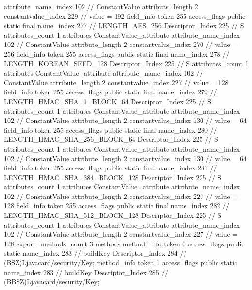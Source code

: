 {{{{{{{					attribute_name_index	102		// ConstantValue
					attribute_length	2
					constantvalue_index	229		// value = 192
				}
				}
			}
			field_info {
				token	255
				access_flags	public static final
				name_index	277		// LENGTH_AES_256
				Descriptor_Index	225		// S
				attributes_count	1
				attributes {
				ConstantValue_attribute {
					attribute_name_index	102		// ConstantValue
					attribute_length	2
					constantvalue_index	270		// value = 256
				}
				}
			}
			field_info {
				token	255
				access_flags	public static final
				name_index	278		// LENGTH_KOREAN_SEED_128
				Descriptor_Index	225		// S
				attributes_count	1
				attributes {
				ConstantValue_attribute {
					attribute_name_index	102		// ConstantValue
					attribute_length	2
					constantvalue_index	227		// value = 128
				}
				}
			}
			field_info {
				token	255
				access_flags	public static final
				name_index	279		// LENGTH_HMAC_SHA_1_BLOCK_64
				Descriptor_Index	225		// S
				attributes_count	1
				attributes {
				ConstantValue_attribute {
					attribute_name_index	102		// ConstantValue
					attribute_length	2
					constantvalue_index	130		// value = 64
				}
				}
			}
			field_info {
				token	255
				access_flags	public static final
				name_index	280		// LENGTH_HMAC_SHA_256_BLOCK_64
				Descriptor_Index	225		// S
				attributes_count	1
				attributes {
				ConstantValue_attribute {
					attribute_name_index	102		// ConstantValue
					attribute_length	2
					constantvalue_index	130		// value = 64
				}
				}
			}
			field_info {
				token	255
				access_flags	public static final
				name_index	281		// LENGTH_HMAC_SHA_384_BLOCK_128
				Descriptor_Index	225		// S
				attributes_count	1
				attributes {
				ConstantValue_attribute {
					attribute_name_index	102		// ConstantValue
					attribute_length	2
					constantvalue_index	227		// value = 128
				}
				}
			}
			field_info {
				token	255
				access_flags	public static final
				name_index	282		// LENGTH_HMAC_SHA_512_BLOCK_128
				Descriptor_Index	225		// S
				attributes_count	1
				attributes {
				ConstantValue_attribute {
					attribute_name_index	102		// ConstantValue
					attribute_length	2
					constantvalue_index	227		// value = 128
				}
				}
			}
			}
			export_methods_count	3
			methods {
				method_info {
					token	0
					access_flags	public static
					name_index	283		// buildKey
					Descriptor_Index	284		// (BSZ)Ljavacard/security/Key;
				}
				method_info {
					token	1
					access_flags	public static
					name_index	283		// buildKey
					Descriptor_Index	285		// (BBSZ)Ljavacard/security/Key;
				}
}}}}
